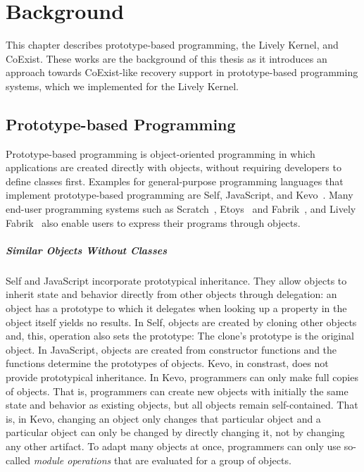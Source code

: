 \chapter{Background} \label{chapter:BACKGROUND}

This chapter describes prototype-based programming, the Lively Kernel, and CoExist.
These works are the background of this thesis as it introduces an approach towards CoExist-like recovery support in prototype-based programming systems, which we implemented for the Lively Kernel.

\section{Prototype-based Programming}

Prototype-based programming is object-oriented programming in which applications are created directly with objects, without requiring developers to define classes first.
Examples for general-purpose programming languages that implement prototype-based programming are Self, JavaScript, and Kevo~\cite{Taivalsaari1992Kevo}.
Many end-user programming systems such as Scratch~\cite{Maloney2010SPL}, Etoys~\cite{Kay2005Etoys} and Fabrik~\cite{Ingalls1988FVP}, and Lively Fabrik~\cite{Lincke2009LFW} also enable users to express their programs through objects.

\paragraph{Similar Objects Without Classes}
Self and JavaScript incorporate prototypical inheritance.
They allow objects to inherit state and behavior directly from other objects through delegation: an object has a prototype to which it delegates when looking up a property in the object itself yields no results.
In Self, objects are created by cloning other objects and, this, operation also sets the prototype: The clone's prototype is the original object.
In JavaScript, objects are created from constructor functions and the functions determine the prototypes of objects.
Kevo, in constrast, does not provide prototypical inheritance.
In Kevo, programmers can only make full copies of objects.
That is, programmers can create new objects with initially the same state and behavior as existing objects, but all objects remain self-contained.
That is, in Kevo, changing an object only changes that particular object and a particular object can only be changed by directly changing it, not by changing any other artifact.
To adapt many objects at once, programmers can only use so-called \emph{module operations} that are evaluated for a group of objects. 

